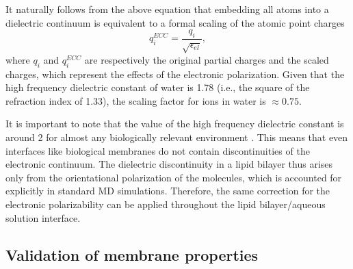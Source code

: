 \documentclass[journal=jpcbfk,manuscript=article]{achemso}
\begin{document}
It naturally follows from the above equation that 
embedding all atoms into a dielectric continuum 
is equivalent to a formal scaling of the atomic point charges 
\begin{equation}  \label{eq:scaling}
 q_i ^{ECC} = \frac{q_i}{\sqrt{\epsilon _{el}}} ,
\end{equation} 
where $q_i$ and $q_i^{ECC}$ are respectively the original partial charges and the scaled charges, 
which represent the effects of the electronic polarization. 
Given that the  high frequency dielectric constant of water is 1.78 (i.e., the square of the refraction index of 1.33), 
the scaling factor for ions in water is $\approx 0.75$. 

It is important to note that the value of the high frequency dielectric constant  
is around 2 for almost any biologically relevant environment \citep{leontyev11}. 
This means that even interfaces like biological membranes do not contain discontinuities of the electronic continuum. 
The dielectric discontinuity in a lipid bilayer thus arises only 
from the orientational polarization of the molecules, which is accounted for explicitly in standard MD simulations.  
Therefore, the same correction for the electronic polarizability can be  
applied throughout the lipid bilayer/aqueous solution interface. 

 
 
% 
% 
% 
%
%

\subsection{Validation of membrane properties} 
\end{document}
